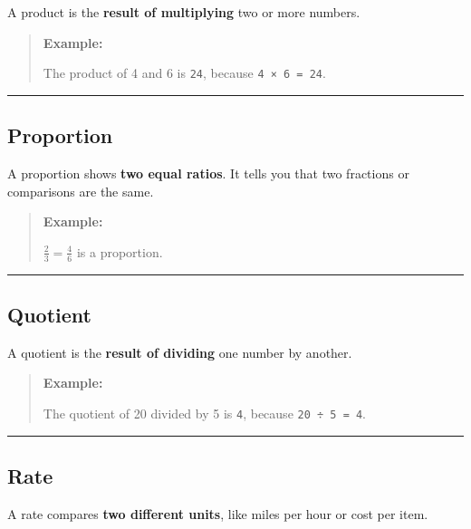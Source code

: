 \documentclass[
  letterpaper,
  DIV=11,
  numbers=noendperiod]{scrreprt}
\begin{document}
A product is the \textbf{result of multiplying} two or more numbers.

\begin{quote}
\textbf{Example:}

The product of 4 and 6 is \texttt{24}, because \texttt{4\ ×\ 6\ =\ 24}.
\end{quote}

\begin{center}\rule{0.5\linewidth}{0.5pt}\end{center}

\subsection*{Proportion}\label{glossary-proportion}

A proportion shows \textbf{two equal ratios}. It tells you that two
fractions or comparisons are the same.

\begin{quote}
\textbf{Example:}

\(\frac{2}{3} = \frac{4}{6}\) is a proportion.
\end{quote}

\begin{center}\rule{0.5\linewidth}{0.5pt}\end{center}

\subsection*{Quotient}\label{glossary-quotient}

A quotient is the \textbf{result of dividing} one number by another.

\begin{quote}
\textbf{Example:}

The quotient of 20 divided by 5 is \texttt{4}, because
\texttt{20\ ÷\ 5\ =\ 4}.
\end{quote}

\begin{center}\rule{0.5\linewidth}{0.5pt}\end{center}

\subsection*{Rate}\label{glossary-rate}

A rate compares \textbf{two different units}, like miles per hour or
cost per item.
\end{document}
